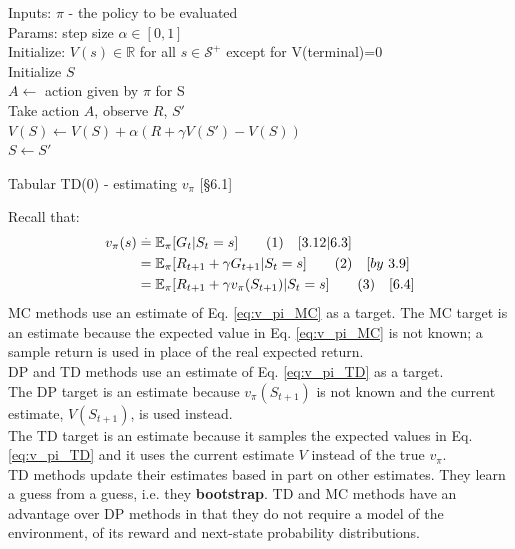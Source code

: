\documentclass[10pt,landscape]{article}
\newcommand\numberthis{\addtocounter{equation}{1}\tag{\theequation}}
\begin{document}
\begin{multicols}{3}
\begin{algorithm}[H]
Inputs: $\pi$ - the policy to be evaluated \\
Params: step size $\alpha \in [0,1]$ \\
Initialize: $V(s) \in \mathbb{R}$ for all $s \in \mathcal{S}^+$ except for V(terminal)=0 \\

{
    Initialize $S$\\
    {
    	$A \leftarrow$ action given by $\pi$ for S\\
    	Take action $A$, observe $R$, $S'$\\
    	$V(S) \leftarrow V(S) + \alpha (R + \gamma V(S') - V(S))$ \\
    	$S \leftarrow S'$   
    }
 }
\caption{Tabular TD(0) - estimating $v_{\pi}$ [§6.1]}
\end{algorithm}

Recall that:
\begin{align*}
v_{\pi}(s) & \stackrel{.}{=} \mathbb{E}_{\pi}[G_t | S_t = s]  \label{eq:v_pi_MC} \numberthis  \quad [3.12 | 6.3]\\
& = \mathbb{E}_{\pi}[R_{t+1} + \gamma G_{t+1} | S_t = s] \label{eq:v_pi_MC2}  \numberthis  \quad [by \ 3.9] \\
& = \mathbb{E}_{\pi}[R_{t+1} + \gamma v_{\pi}(S_{t+1}) | S_t = s] \label{eq:v_pi_TD} \numberthis  \quad [6.4] \\
\end{align*}
MC methods use an estimate of Eq. \ref{eq:v_pi_MC} as a target. 
The MC target is an estimate because the expected value in Eq. \ref{eq:v_pi_MC} is not known; a sample return is used in place of the real expected return.\\

DP and TD methods use an estimate of Eq. \ref{eq:v_pi_TD} as a target.\\
The DP target is an estimate because $v_{\pi}(S_{t+1})$ is not known and the current estimate, $V(S_{t+1})$, is used instead. \\
The TD target is an estimate because it samples the expected values in Eq. \ref{eq:v_pi_TD} and it uses the current estimate $V$ instead of the true $v_{\pi}$.\\

TD methods update their estimates based in part on other estimates. They learn a guess from a guess, i.e. they \textbf{bootstrap}.
TD and MC methods have an advantage over DP methods in that they do not require a model of the environment, of its reward and next-state probability distributions.


\end{multicols}
\end{document}
